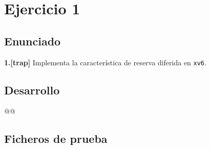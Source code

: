 \section{Ejercicio 1}
\subsection{Enunciado}
\begin{ejer}
    \textbf{1.[trap]} Implementa la característica de reserva diferida en \texttt{xv6}.
\end{ejer}
\subsection{Desarrollo}
\begin{listing}
@@
\end{listing}
\subsection{Ficheros de prueba}

